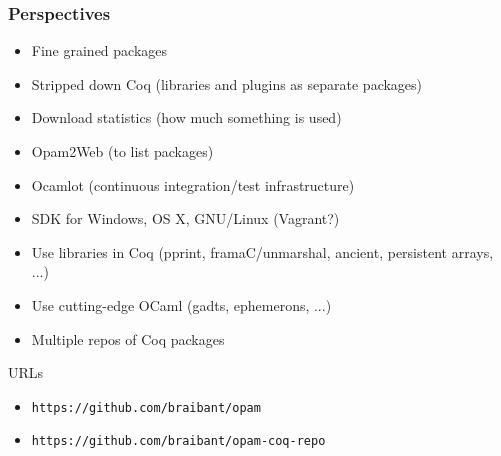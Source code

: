 \documentclass[9pt]{beamer}
\begin{document}
\begin{frame}
  \frametitle {Perspectives}

  \begin{itemize}
  \item Fine grained packages 
  \item Stripped down Coq (libraries and plugins as separate packages)
  \item Download statistics (how much something is used)
  \item Opam2Web (to list packages)
  \item Ocamlot (continuous integration/test infrastructure)
  \item SDK for Windows, OS X, GNU/Linux (Vagrant?)
  \item Use libraries in Coq (pprint, framaC/unmarshal, ancient, persistent arrays, ...)
  \item Use cutting-edge OCaml (gadts, ephemerons, ...)
  \item Multiple repos of Coq packages
  \end{itemize}
\end{frame}

\begin{frame}{URLs}
  \begin{itemize}
  \item \texttt{https://github.com/braibant/opam}
  \item \texttt{https://github.com/braibant/opam-coq-repo}
  \end{itemize}  


\end{frame}



\end{document}
